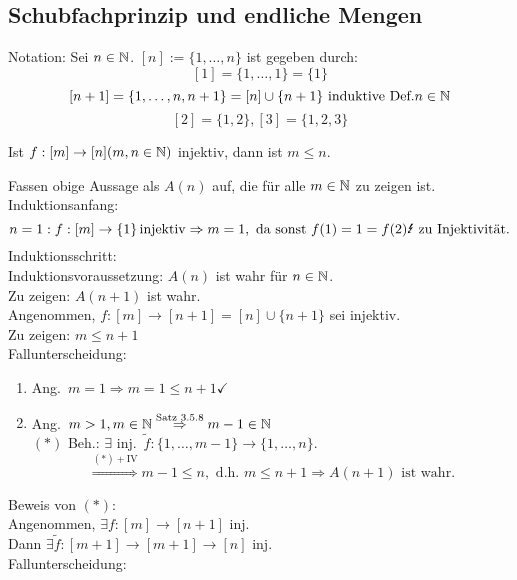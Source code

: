 \documentclass[../ana1.tex]{subfiles}
\begin{document}
\subsection{Schubfachprinzip und endliche Mengen}
Notation: Sei \( n\in\mathbb{N} \). \([n] := \{1,\ldots,n\} \) ist gegeben durch:
\[ [1] = \{1,\ldots,1\} = \{1\} \]
\[ [n+1] = \{1,\ldots,n,n+1\} = [n] \cup \{n+1\}\text{ induktive Def.} n\in\mathbb{N} \]
\[ [2]=\{1,2\}, [3]=\{1,2,3\} \]

\begin{satz}[Schubfachprinzip]
	Ist \(f:[m]\rightarrow [n] (m,n\in\mathbb{N}) \) injektiv, dann ist \(m\leq n\).
\end{satz}
\begin{bew}
	Fassen obige Aussage als \(A(n)\) auf, die für alle \(m\in\mathbb{N} \) zu zeigen ist.\\
	Induktionsanfang:
	\[ n=1: f:[m] \rightarrow \{1\} \injektiv \Rightarrow m=1, \text{ da sonst } f(1) = 1 = f(2) \text{\Lightning{} zu Injektivität}.\]
	Induktionsschritt:\\
	Induktionsvoraussetzung: \(A(n)\) ist wahr für \(n\in\mathbb{N} \).\\
	Zu zeigen: \(A(n+1)\) ist wahr.\\
	Angenommen, \(f:[m]\rightarrow[n+1] = [n] \cup \{n+1\} \) sei injektiv.\\
	Zu zeigen: \(m\leq n+1\) \\
	Fallunterscheidung:
	\begin{enumerate}
		\item Ang.\  \(m=1 \Rightarrow m=1\leq n+1\checkmark{}\)
		\item Ang.\  \(m>1, m\in\mathbb{N} \overset{\text{Satz 3.5.8}}{\Rightarrow} m-1\in\mathbb{N} \) \\
		      \((*)\) Beh.: \(\exists \) inj.\  \(\tilde{f}: \{1,\ldots,m-1\}\rightarrow \{1,\ldots,n\} \).\\
		      \[ \overset{(*) + \text{IV}}{\Rightarrow} m-1\leq n, \text{ d.h. } m\leq n+1 \Rightarrow A(n+1) \text{ ist wahr}.\]
	\end{enumerate}
	Beweis von \((*)\):\\
	Angenommen, \(\exists f: [m]\rightarrow[n+1]\) inj.\\
	Dann \(\exists \tilde{f}: [m+1]\rightarrow [m+1]\rightarrow[n]\) inj.\\
	Fallunterscheidung:
\end{bew}
\end{document}
